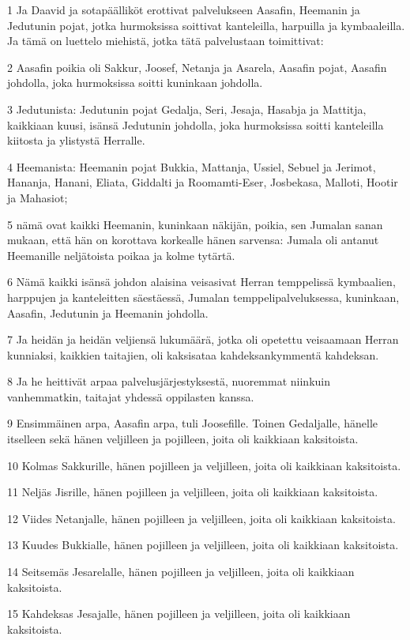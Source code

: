 \par 1 Ja Daavid ja sotapäälliköt erottivat palvelukseen Aasafin, Heemanin ja Jedutunin pojat, jotka hurmoksissa soittivat kanteleilla, harpuilla ja kymbaaleilla. Ja tämä on luettelo miehistä, jotka tätä palvelustaan toimittivat:
\par 2 Aasafin poikia oli Sakkur, Joosef, Netanja ja Asarela, Aasafin pojat, Aasafin johdolla, joka hurmoksissa soitti kuninkaan johdolla.
\par 3 Jedutunista: Jedutunin pojat Gedalja, Seri, Jesaja, Hasabja ja Mattitja, kaikkiaan kuusi, isänsä Jedutunin johdolla, joka hurmoksissa soitti kanteleilla kiitosta ja ylistystä Herralle.
\par 4 Heemanista: Heemanin pojat Bukkia, Mattanja, Ussiel, Sebuel ja Jerimot, Hananja, Hanani, Eliata, Giddalti ja Roomamti-Eser, Josbekasa, Malloti, Hootir ja Mahasiot;
\par 5 nämä ovat kaikki Heemanin, kuninkaan näkijän, poikia, sen Jumalan sanan mukaan, että hän on korottava korkealle hänen sarvensa: Jumala oli antanut Heemanille neljätoista poikaa ja kolme tytärtä.
\par 6 Nämä kaikki isänsä johdon alaisina veisasivat Herran temppelissä kymbaalien, harppujen ja kanteleitten säestäessä, Jumalan temppelipalveluksessa, kuninkaan, Aasafin, Jedutunin ja Heemanin johdolla.
\par 7 Ja heidän ja heidän veljiensä lukumäärä, jotka oli opetettu veisaamaan Herran kunniaksi, kaikkien taitajien, oli kaksisataa kahdeksankymmentä kahdeksan.
\par 8 Ja he heittivät arpaa palvelusjärjestyksestä, nuoremmat niinkuin vanhemmatkin, taitajat yhdessä oppilasten kanssa.
\par 9 Ensimmäinen arpa, Aasafin arpa, tuli Joosefille. Toinen Gedaljalle, hänelle itselleen sekä hänen veljilleen ja pojilleen, joita oli kaikkiaan kaksitoista.
\par 10 Kolmas Sakkurille, hänen pojilleen ja veljilleen, joita oli kaikkiaan kaksitoista.
\par 11 Neljäs Jisrille, hänen pojilleen ja veljilleen, joita oli kaikkiaan kaksitoista.
\par 12 Viides Netanjalle, hänen pojilleen ja veljilleen, joita oli kaikkiaan kaksitoista.
\par 13 Kuudes Bukkialle, hänen pojilleen ja veljilleen, joita oli kaikkiaan kaksitoista.
\par 14 Seitsemäs Jesarelalle, hänen pojilleen ja veljilleen, joita oli kaikkiaan kaksitoista.
\par 15 Kahdeksas Jesajalle, hänen pojilleen ja veljilleen, joita oli kaikkiaan kaksitoista.
